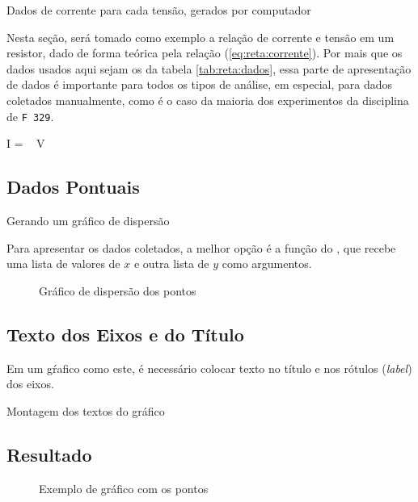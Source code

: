 \begin{table}[H]
    \centering
    
    \caption{Dados de corrente para cada tensão, gerados por computador}
    \label{tab:reta:dados}
\end{table}

Nesta seção, será tomado como exemplo a relação de corrente e tensão em um resistor, dado de forma teórica pela relação (\ref{eq:reta:corrente}). Por mais que os dados usados aqui sejam os da tabela \ref{tab:reta:dados}, essa parte de apresentação de dados é importante para todos os tipos de análise, em especial, para dados coletados manualmente, como é o caso da maioria dos experimentos da disciplina de \texttt{F 329}.

\begin{equacao} \label{eq:reta:corrente}
    I =  ~ V
\end{equacao}


\subsection{Dados Pontuais}

    \begin{listing}[H]
        \caption{Gerando um gráfico de dispersão}
        \label{code:reta:scatter}

    \end{listing}

    Para apresentar os dados coletados, a melhor opção é a função  do \pyplot, que recebe uma lista de valores de $x$ e outra lista de $y$ como argumentos.

    \begin{figure}[htbp]
        \centering
        

        \caption{Gráfico de dispersão dos pontos}
        \label{fig:reta:dados}
    \end{figure}


\subsection{Texto dos Eixos e do Título}

    Em um gŕafico como este, é necessário colocar texto no título e nos rótulos (\textit{label}) dos eixos.

    \begin{listing}[H]
        \caption{Montagem dos textos do gráfico}
        \label{code:reta:textos}

    \end{listing}


\subsection{Resultado}

    \begin{figure}[htbp]
        \centering
        

        \caption{Exemplo de gráfico com os pontos}
        \label{fig:reta:resultado}
    \end{figure}
